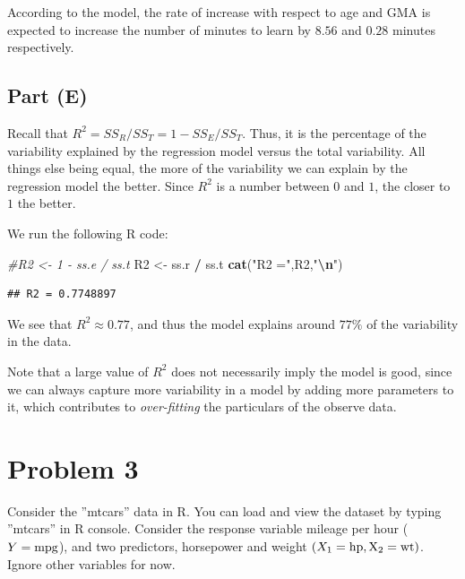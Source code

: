 \documentclass[
]{article}
\newenvironment{Shaded}{\begin{snugshade}}{\end{snugshade}}
\newcommand{\CommentTok}[1]{\textcolor[rgb]{0.56,0.35,0.01}{\textit{#1}}}
\newcommand{\FunctionTok}[1]{\textcolor[rgb]{0.13,0.29,0.53}{\textbf{#1}}}
\newcommand{\NormalTok}[1]{#1}
\newcommand{\OtherTok}[1]{\textcolor[rgb]{0.56,0.35,0.01}{#1}}
\newcommand{\SpecialCharTok}[1]{\textcolor[rgb]{0.81,0.36,0.00}{\textbf{#1}}}
\newcommand{\StringTok}[1]{\textcolor[rgb]{0.31,0.60,0.02}{#1}}
\begin{document}
According to the model, the rate of increase with respect to age and GMA
is expected to increase the number of minutes to learn by \(8.56\) and
\(0.28\) minutes respectively.

\hypertarget{part-e-1}{%
\subsection{Part (E)}\label{part-e-1}}


Recall that \(R^2 = SS_R / SS_T = 1 - SS_E / SS_T\). Thus, it is the
percentage of the variability explained by the regression model versus
the total variability. All things else being equal, the more of the
variability we can explain by the regression model the better. Since
\(R^2\) is a number between \(0\) and \(1\), the closer to \(1\) the
better.

We run the following R code:

\begin{Shaded}
\begin{Highlighting}[]
\CommentTok{\#R2 \textless{}{-} 1 {-} ss.e / ss.t}
\NormalTok{R2 }\OtherTok{\textless{}{-}}\NormalTok{ ss.r }\SpecialCharTok{/}\NormalTok{ ss.t}
\FunctionTok{cat}\NormalTok{(}\StringTok{"R2 ="}\NormalTok{,R2,}\StringTok{"}\SpecialCharTok{\textbackslash{}n}\StringTok{"}\NormalTok{)}
\end{Highlighting}
\end{Shaded}

\begin{verbatim}
## R2 = 0.7748897
\end{verbatim}

We see that \(R^2 \approx 0.77\), and thus the model explains around
\(77\%\) of the variability in the data.

Note that a large value of \(R^2\) does not necessarily imply the model
is good, since we can always capture more variability in a model by
adding more parameters to it, which contributes to \emph{over-fitting}
the particulars of the observe data.

\hypertarget{problem-3}{%
\section{Problem 3}\label{problem-3}}

Consider the ''mtcars'' data in R. You can load and view the dataset by
typing ''mtcars'' in R console. Consider the response variable mileage
per hour (\(Y=\rm{mpg}\)), and two predictors, horsepower and weight
\((X_1 = \rm{hp}, X_2 = \rm{wt})\). Ignore other variables for now.
\end{document}
